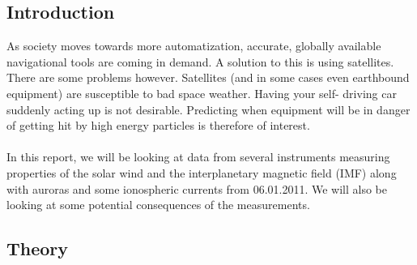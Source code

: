 \documentclass[norsk,a4paper,12pt]{article}
\begin{document}
\begin{multicols}{2}


\newpage

\section{Introduction} %
\label{sec:intro}
	As society moves towards more automatization, accurate, globally available navigational tools are coming in demand. A solution to this is using satellites. 			There are some problems however. Satellites (and in some cases even earthbound equipment) are susceptible to bad space weather. Having your self-			driving car suddenly acting up is not desirable. Predicting when equipment will be in danger of getting hit by high energy particles is therefore of interest.\\ 
	\\
	In this report, we will be looking at data from several instruments measuring properties of the solar wind and the interplanetary magnetic field (IMF) along 			with auroras and some ionospheric currents from 06.01.2011. We will also be looking at some potential consequences of the measurements.





\subsection{Theory} %
\label{sub:theory}

\end{multicols}
\end{document}
